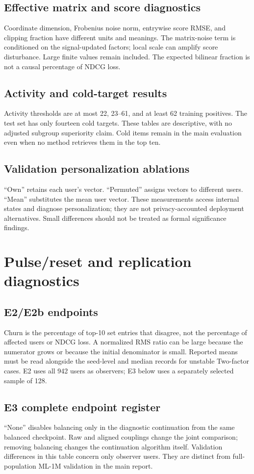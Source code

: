 \documentclass[10pt,a4paper]{article}
\begin{document}
\subsection{Effective matrix and score diagnostics}
Coordinate dimension, Frobenius noise norm, entrywise score RMSE, and clipping
fraction have different units and meanings. The matrix-noise term is
conditioned on the signal-updated factors; local scale can amplify score
disturbance. Large finite values remain included. The expected bilinear
fraction is not a causal percentage of NDCG loss.


\clearpage
\subsection{Activity and cold-target results}
Activity thresholds are at most 22, 23--61, and at least 62 training positives.
The test set has only fourteen cold targets. These tables are descriptive,
with no adjusted subgroup superiority claim. Cold items remain in the
main evaluation even when no method retrieves them in the top ten.

\clearpage
\subsection{Validation personalization ablations}
``Own'' retains each user's vector. ``Permuted'' assigns vectors to different
users. ``Mean'' substitutes the mean user vector. These measurements access
internal states and diagnose personalization; they are not privacy-accounted
deployment alternatives. Small differences should not be treated as formal
significance findings.

\clearpage
\section{Pulse/reset and replication diagnostics}
\subsection{E2/E2b endpoints}
Churn is the percentage of top-10 set entries that disagree, not the
percentage of affected users or NDCG loss. A normalized RMS ratio can be
large because the numerator grows or because the initial denominator is
small. Reported means must be read alongside the seed-level and median
records for unstable Two-factor cases. E2 uses all 942 users as observers;
E3 below uses a separately selected sample of 128.

\clearpage
\subsection{E3 complete endpoint register}

``None'' disables balancing only in the diagnostic continuation from the
same balanced checkpoint. Raw and aligned couplings change the joint
comparison; removing balancing changes the continuation algorithm itself.
Validation differences in this table concern only observer users. They
are distinct from full-population ML-1M validation in the main report.

\clearpage
\end{document}
